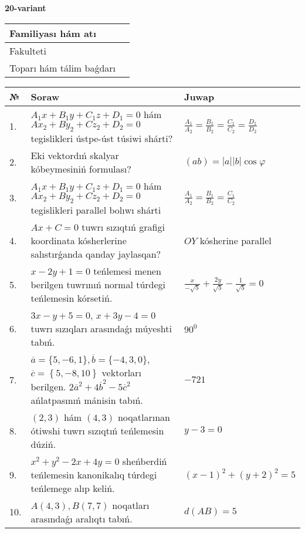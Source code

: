 \documentclass{article}
\begin{document}
\egroup

\newpage


\textbf{20-variant}\\

\bgroup
\def\arraystretch{1.6} %

\begin{tabular}{|m{5.7cm}|m{9.5cm}|}
\hline
Familiyası hám atı & \\
\hline
Fakulteti  & \\
\hline
Toparı hám tálim baǵdarı  & \\
\hline
\end{tabular}

\vspace{1cm}

\begin{tabular}{|m{0.7cm}|m{10cm}|m{4cm}|}
\hline
№ & Soraw & Juwap \\
\hline
1. & $A_1x+B_1y+C_1z+D_1=0$ hám $Ax_2+By_2+Cz_2+D_2=0$ tegislikleri ústpe-úst túsiwi shárti? & $\frac{A_1}{A_2}=\frac{B_1}{B_2}=\frac{C_1}{C_2}=\frac{D_1}{D_2}$ \\
\hline
2. & Eki vektordıń skalyar kóbeymesiniń formulası? & $(ab)=|a||b|\cos\varphi$ \\
\hline
3. & $A_1x+B_1y+C_1z+D_1=0$ hám $Ax_2+By_2+Cz_2+D_2=0$ tegislikleri parallel bolıwı shárti & $\frac{A_1}{A_2}=\frac{B_1}{B_2}=\frac{C_1}{C_2}$ \\
\hline
4. & $Ax+C=0$ tuwrı sızıqtıń grafigi koordinata kósherlerine salıstırǵanda qanday jaylasqan? & $OY$ kósherine parallel \\
\hline
5. & $x-2y+1=0$ teńlemesi menen berilgen tuwrınıń normal túrdegi teńlemesin kórsetiń. & $\frac{x}{- \sqrt{5}}+\frac{2y}{\sqrt{5}}-\frac{1}{\sqrt{5}}=0$ \\
\hline
6. & $3x-y+5=0$, $x+3y-4=0$ tuwrı sızıqları arasındaǵı múyeshti tabıń. & $90^{0}$ \\
\hline
7. & $\overline{a}=\{5,-6, 1 \}, \overline{b}=\{-4, 3, 0 \} $, $\overline{c}=\left\{ 5,-8, 10 \right\}$ vektorları berilgen. $2{\overline{a}}^{2}+4{\overline{b}}^{2}-5{\overline{c}}^{2}$ ańlatpasınıń mánisin tabıń. & $-721$ \\
\hline
8. & $(2, 3)$ hám $(4, 3)$ noqatlarınan ótiwshi tuwrı sızıqtıń teńlemesin dúziń. & $ y-3=0$ \\
\hline
9. & $x^{2}+y^{2}-2x+4y=0$ sheńberdiń teńlemesin kanonikalıq túrdegi teńlemege alıp keliń. & $(x-1)^{2}+(y+2)^{2}=5$ \\
\hline
10. & $A(4, 3), B(7, 7)$ noqatları arasındaǵı aralıqtı tabıń. & $d(AB)=5$ \\
\hline
\end{tabular}
\end{document}
